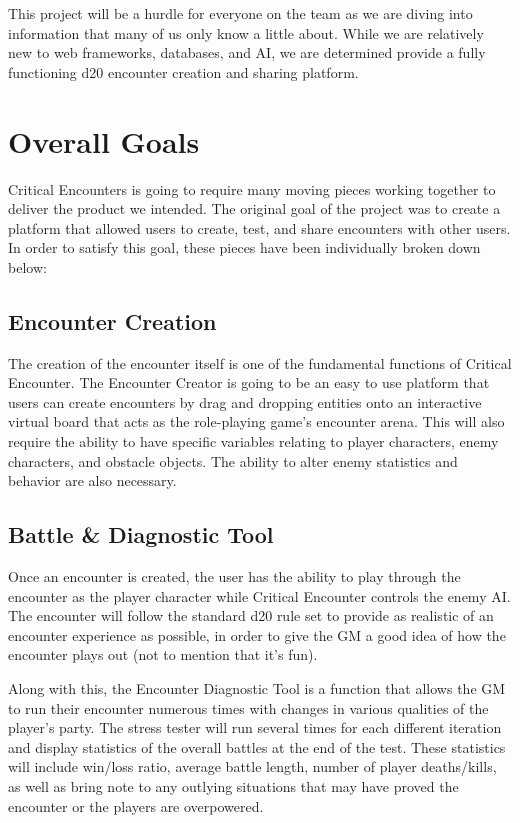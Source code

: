 \documentclass[12pt,a4paper]{report}
\begin{document}
This project will be a hurdle for everyone on the team as we are diving into information that many of us only know a little about. While we are relatively new to web frameworks, databases, and AI, we are determined provide a fully functioning d20 encounter creation and sharing platform.
	\section{Overall Goals}
	Critical Encounters is going to require many moving pieces working together to deliver the product we intended. The original goal of the project was to create a platform that allowed users to create, test, and share encounters with other users. In order to satisfy this goal, these pieces have been individually broken down below:
		\subsection{Encounter Creation}
		The creation of the encounter itself is one of the fundamental functions of Critical Encounter. The Encounter Creator is going to be an easy to use platform that users can create encounters by drag and dropping entities onto an interactive virtual board that acts as the role-playing game's encounter arena. This will also require the ability to have specific variables relating to player characters, enemy characters, and obstacle objects. The ability to alter enemy statistics and behavior are also necessary.
		\subsection{Battle \& Diagnostic Tool}
		Once an encounter is created, the user has the ability to play through the encounter as the player character while Critical Encounter controls the enemy AI. The encounter will follow the standard d20 rule set to provide as realistic of an encounter experience as possible, in order to give the GM a good idea of how the encounter plays out (not to mention that it's fun).
		
		Along with this, the Encounter Diagnostic Tool is a function that allows the GM to run their encounter numerous times with changes in various qualities of the player's party. The stress tester will run several times for each different iteration and display statistics of the overall battles at the end of the test. These statistics will include win/loss ratio, average battle length, number of player deaths/kills, as well as bring note to any outlying situations that may have proved the encounter or the players are overpowered.  
\end{document}
